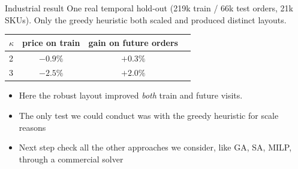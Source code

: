 \documentclass[11pt,aspectratio=169]{beamer}
\newcommand{\kk}{\kappa}
\begin{document}
\begin{frame}{Industrial result}
  One real temporal hold-out (219k train / 66k test orders, 21k SKUs).
  Only the greedy heuristic both scaled and produced distinct layouts.
  \begin{center}\small
  \begin{tabular}{@{}lccc@{}}
    \toprule
    $\kk$ & price on train & gain on future orders \\
    \midrule
    2 & $-0.9\%$ & $+0.3\%$ \\
    3 & $-2.5\%$ & $+2.0\%$ \\
    \bottomrule
  \end{tabular}
  \end{center}
  \vspace{0.4em}
  \begin{itemize}
    \item Here the robust layout improved \emph{both} train and future visits.
    \item The only test we could conduct was with the greedy heuristic for scale reasons
    \item Next step check all the other approaches we consider, like GA, SA, MILP, through a commercial solver
  \end{itemize}
\end{frame}
\end{document}
